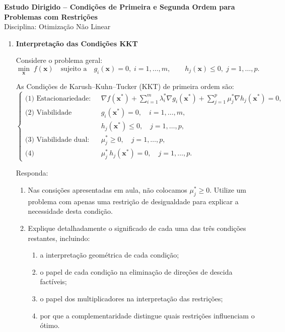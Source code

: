 \documentclass[9pt,a4paper]{extarticle}
\begin{document}
\begin{center}
  \Large \textbf{Estudo Dirigido – Condições de Primeira e Segunda Ordem para Problemas com Restrições} \\[4pt]
  \normalsize Disciplina: Otimização Não Linear
\end{center}

\begin{enumerate}


\item \textbf{Interpretação das Condições KKT}

Considere o problema geral:
\[
\min_{\mathbf{x}} \; f(\mathbf{x})
\quad\text{sujeito a}\quad 
g_i(\mathbf{x}) = 0,\; i=1,\ldots,m,\qquad
h_j(\mathbf{x}) \le 0,\; j=1,\ldots,p.
\]

As Condições de Karush--Kuhn--Tucker (KKT) de primeira ordem são:
\[
\begin{cases}
\text{(1) Estacionariedade:} 
& \nabla f(\mathbf{x}^*) 
+ \displaystyle\sum_{i=1}^m \lambda_i^* \nabla g_i(\mathbf{x}^*)
+ \displaystyle\sum_{j=1}^p \mu_j^* \nabla h_j(\mathbf{x}^*)
= 0, \\[6pt]

\text{(2) Viabilidade primária:}
& g_i(\mathbf{x}^*) = 0,\quad i=1,\ldots,m, \\
& h_j(\mathbf{x}^*) \le 0,\quad j=1,\ldots,p, \\[6pt]

\text{(3) Viabilidade dual:} 
& \mu_j^* \ge 0,\quad j=1,\ldots,p, \\[6pt]

\text{(4) Complementaridade:}
& \mu_j^* \, h_j(\mathbf{x}^*) = 0,\quad j=1,\ldots,p.
\end{cases}
\]

Responda:

\begin{enumerate}
    \item Nas consições apresentadas em aula, não colocamos $\mu_j^* \geq 0$. Utilize um problema com apenas uma restrição de desigualdade para explicar a necessidade desta condição.  
    \item Explique detalhadamente o significado de cada uma das três condições restantes, incluindo:
    \begin{enumerate}
        \item a interpretação geométrica de cada condição;
        \item o papel de cada condição na eliminação de direções de descida factíveis;
        \item o papel dos multiplicadores na interpretação das restrições;
        \item por que a complementaridade distingue quais restrições influenciam o ótimo.
    \end{enumerate}
\end{enumerate}





\end{enumerate}
\end{document}
